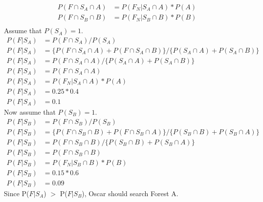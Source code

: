     \begin{equation} \label{eq5}
        \begin{split}
            P(F \cap S_A \cap A) &=  P(F_N|S_A \cap A)*P(A) \\
            P(F \cap S_B \cap B) &=  P(F_N|S_B \cap B)*P(B) \\ 
        \end{split}
    \end{equation}
    Assume that $P(S_A) = 1$. \\
        \begin{align*}
            P(F|S_A) &= P(F \cap S_A)\slash P(S_A) \\
            P(F|S_{A}) &= \{P(F \cap S_{A}\cap A) + P(F \cap S_{A}\cap B)\}\slash \{P(S_A \cap A)+P(S_A \cap B)\} \\
            P(F|S_{A}) &= {P(F \cap S_{A}\cap A)}\slash\{P(S_{A} \cap A)+ P(S_{A}\cap B)\} \\
            P(F|S_{A}) &= P(F \cap S_A \cap A) \\
            P(F|S_{A}) &= P(F_N|S_A \cap A)*P(A) \\
            P(F|S_{A}) &= 0.25*0.4 \\
            P(F|S_{A}) &= 0.1               
        \end{align*}
    Now assume that $P(S_B) = 1$. \\
        \begin{align*}
            P(F|S_B) &= P(F \cap S_B)\slash P(S_B) \\
            P(F|S_{B}) &= \{P(F \cap S_{B}\cap B) + P(F \cap S_{B}\cap A)\}\slash \{P(S_B \cap B)+P(S_B \cap A)\} \\
            P(F|S_{B}) &= {P(F \cap S_{B}\cap B)}\slash\{P(S_{B} \cap B)+ P(S_{B}\cap A)\} \\
            P(F|S_{B}) &= P(F \cap S_B \cap B) \\
            P(F|S_{B}) &= P(F_N|S_B \cap B)*P(B) \\
            P(F|S_{B}) &= 0.15*0.6 \\
            P(F|S_{B}) &= 0.09               
        \end{align*}
    Since P($F|S_{A}$) $>$ P($F|S_{B}$), Oscar should search Forest A.
\pagebreak